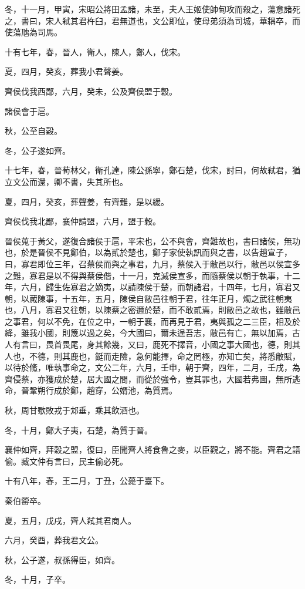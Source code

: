 \begin{pinyinscope}
冬，十一月，甲寅，宋昭公將田孟諸，未至，夫人王姬使帥甸攻而殺之，蕩意諸死之，書曰，宋人弒其君杵臼，君無道也，文公即位，使母弟須為司城，華耦卒，而使蕩虺為司馬。

十有七年，春，晉人，衛人，陳人，鄭人，伐宋。

夏，四月，癸亥，葬我小君聲姜。

齊侯伐我西鄙，六月，癸未，公及齊侯盟于穀。

諸侯會于扈。

秋，公至自穀。

冬，公子遂如齊。

十七年，春，晉荀林父，衛孔達，陳公孫寧，鄭石楚，伐宋，討曰，何故弒君，猶立文公而還，卿不書，失其所也。

夏，四月，癸亥，葬聲姜，有齊難，是以緩。

齊侯伐我北鄙，襄仲請盟，六月，盟于穀。

晉侯蒐于黃父，遂復合諸侯于扈，平宋也，公不與會，齊難故也，書曰諸侯，無功也，於是晉侯不見鄭伯，以為貳於楚也，鄭子家使執訊而與之書，以告趙宣子，曰，寡君即位三年，召蔡侯而與之事君，九月，蔡侯入于敝邑以行，敝邑以侯宣多之難，寡君是以不得與蔡侯偕，十一月，克減侯宣多，而隨蔡侯以朝于執事，十二年，六月，歸生佐寡君之嫡夷，以請陳侯于楚，而朝諸君，十四年，七月，寡君又朝，以蕆陳事，十五年，五月，陳侯自敝邑往朝于君，往年正月，燭之武往朝夷也，八月，寡君又往朝，以陳蔡之密邇於楚，而不敢貳焉，則敝邑之故也，雖敝邑之事君，何以不免，在位之中，一朝于襄，而再見于君，夷與孤之二三臣，相及於絳，雖我小國，則篾以過之矣，今大國曰，爾未逞吾志，敝邑有亡，無以加焉，古人有言曰，畏首畏尾，身其餘幾，又曰，鹿死不擇音，小國之事大國也，德，則其人也，不德，則其鹿也，鋌而走險，急何能擇，命之罔極，亦知亡矣，將悉敝賦，以待於鯈，唯執事命之，文公二年，六月，壬申，朝于齊，四年，二月，壬戌，為齊侵蔡，亦獲成於楚，居大國之間，而從於強令，豈其罪也，大國若弗圖，無所逃命，晉鞏朔行成於鄭，趙穿，公婿池，為質焉。

秋，周甘歜敗戎于邥垂，乘其飲酒也。

冬，十月，鄭大子夷，石楚，為質于晉。

襄仲如齊，拜穀之盟，復曰，臣聞齊人將食魯之麥，以臣觀之，將不能。齊君之語偷。臧文仲有言曰，民主偷必死。

十有八年，春，王二月，丁丑，公薨于臺下。

秦伯罃卒。

夏，五月，戊戌，齊人弒其君商人。

六月，癸酉，葬我君文公。

秋，公子遂，叔孫得臣，如齊。

冬，十月，子卒。


\end{pinyinscope}
